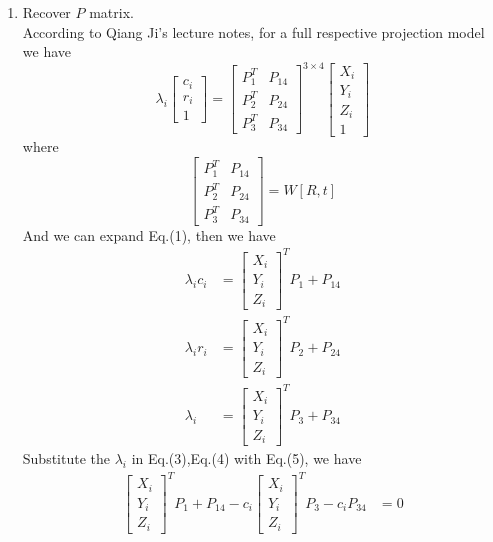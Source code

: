 \documentclass{article}
\begin{document}
\begin{enumerate}%

\item Recover $P$ matrix.\\

According to Qiang Ji's lecture notes, for a full respective projection model we have
\begin{equation}
\lambda_i\begin{bmatrix}c_i\\r_i\\1\end{bmatrix}=\begin{bmatrix}P_1^T&P_{14}\\P_2^T&P_{24}\\P_3^T&P_{34}\end{bmatrix}^{3\times4}\begin{bmatrix}X_i\\Y_i\\Z_i\\1\end{bmatrix}
\end{equation}
where
\begin{equation}
\begin{bmatrix}P_1^T&P_{14}\\P_2^T&P_{24}\\P_3^T&P_{34}\end{bmatrix}=W[R,t]
\end{equation}
And we can expand Eq.(1), then we have
\begin{align}
\lambda_ic_i&=\begin{bmatrix}X_i\\Y_i\\Z_i\end{bmatrix}^TP_1+P_{14}
\\\lambda_ir_i&=\begin{bmatrix}X_i\\Y_i\\Z_i\end{bmatrix}^TP_2+P_{24}
\\\lambda_i&=\begin{bmatrix}X_i\\Y_i\\Z_i\end{bmatrix}^TP_3+P_{34}
\end{align}
Substitute the $\lambda_i$ in Eq.(3),Eq.(4) with Eq.(5), we have
\begin{align}
\begin{bmatrix}X_i\\Y_i\\Z_i\end{bmatrix}^TP_1+P_{14}-c_i\begin{bmatrix}X_i\\Y_i\\Z_i\end{bmatrix}^TP_3-c_iP_{34}&=0

\end{align}
\end{enumerate}
\end{document}
